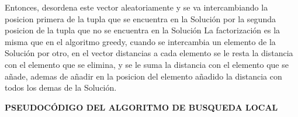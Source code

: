 \documentclass{article}
\begin{document}
\newline Entonces, desordena este vector aleatoriamente y se va intercambiando la posicion primera 
de la tupla que se encuentra en la Solución por la segunda posicion de la tupla que no se encuentra en la Solución
\newline La factorización es la misma que en el algoritmo greedy, cuando se intercambia un elemento de la Solución 
por otro, en el vector distancias a cada elemento se le resta la distancia con el elemento que se elimina, 
y se le suma la distancia con el elemento que se añade, ademas de añadir en la posicion del elemento añadido 
la distancia con todos los demas de la Solución.

\vspace{10mm}
\newpage
\maketitle \textbf{PSEUDOCÓDIGO DEL ALGORITMO DE BUSQUEDA LOCAL}
\end{document}
